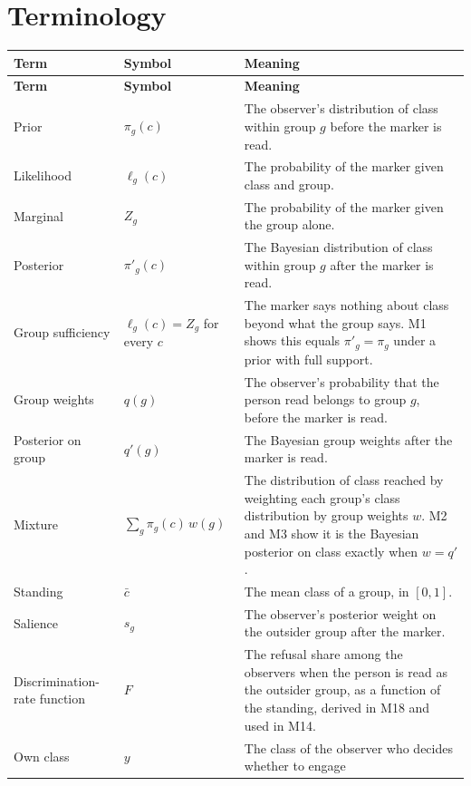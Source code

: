 \section{Terminology}
\label{app:terms}

\footnotesize
\begin{longtable}{@{}P{3.4cm}P{4.2cm}P{8.6cm}@{}}
\toprule
\textbf{Term} & \textbf{Symbol} & \textbf{Meaning} \\
\midrule
\endfirsthead
\toprule
\textbf{Term} & \textbf{Symbol} & \textbf{Meaning} \\
\midrule
\endhead
\bottomrule
\endfoot
Prior & $\pi_g(c)$ & The observer's distribution of class within group $g$
  before the marker is read. \\ \addlinespace
Likelihood & $\ell_g(c)$ & The probability of the marker given class and
  group. \\ \addlinespace
Marginal & $Z_g$ & The probability of the marker given the group alone. \\
  \addlinespace
Posterior & $\pi'_g(c)$ & The Bayesian distribution of class within group $g$
  after the marker is read. \\ \addlinespace
Group sufficiency & $\ell_g(c)=Z_g$ for every $c$ & The marker says nothing
  about class beyond what the group says. M1 shows this equals
  $\pi'_g=\pi_g$ under a prior with full support. \\ \addlinespace
Group weights & $q(g)$ & The observer's probability that the person
  read belongs to group $g$, before the marker is read. \\ \addlinespace
Posterior on group & $q'(g)$ & The Bayesian group weights after the marker
  is read. \\ \addlinespace
Mixture & $\sum_g\pi_g(c)\,w(g)$ & The distribution of class reached by
  weighting each group's class distribution by group weights $w$. M2 and M3
  show it is the Bayesian posterior on class exactly when $w=q'$. \\
  \addlinespace
Standing & $\bar c$ & The mean class of a group, in $[0,1]$. \\ \addlinespace
Salience & $s_g$ & The observer's posterior weight on the outsider group
  after the marker. \\ \addlinespace
Discrimination-rate function & $F$ & The refusal share among the observers
  when the person is read as the outsider group, as a function of the
  standing, derived in M18 and used in M14. \\ \addlinespace
Own class & $y$ & The class of the observer who decides whether to engage

\end{longtable}
